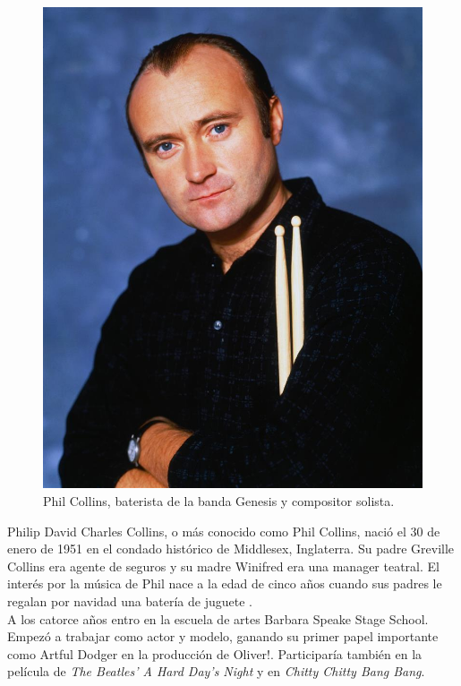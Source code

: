\documentclass[11pt, oneside]{book}
\begin{document}
  \begin{figure}
    \begin{center}
      \includegraphics[scale = 0.6]{img/01.jpg}
    \end{center}
    \caption*{Phil Collins, baterista de la banda Genesis y compositor solista.}
  \end{figure}

  Philip David Charles Collins, o más conocido como Phil Collins, nació el 30 de enero de 1951 en el condado histórico de Middlesex,  Inglaterra. Su padre Greville Collins era agente de seguros y su madre Winifred era una manager teatral. El interés por la música de Phil nace a la edad de cinco años cuando sus padres le regalan por navidad una batería de juguete \cite{WIKI}.\\

  A los catorce años entro en la escuela de artes Barbara Speake Stage School. Empezó a trabajar como actor y modelo, ganando su primer papel importante como Artful Dodger en la producción de Oliver!. Participaría también en la película de \emph{The Beatles' A Hard Day's Night} y en \emph{Chitty Chitty Bang Bang}.\\
\end{document}
